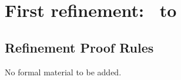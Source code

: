 \part{First refinement: \Abs\ to \Betw}
\chapter{Refinement Proof Rules}\label{ch9}

No formal material to be added.
